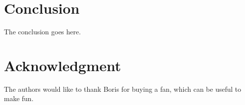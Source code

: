 \documentclass[conference]{IEEEtran}
\begin{document}
\section{Conclusion}
The conclusion goes here.






\section*{Acknowledgment}


The authors would like to thank Boris for buying a fan, which can be useful to make fun.









%
%
%




\end{document}
